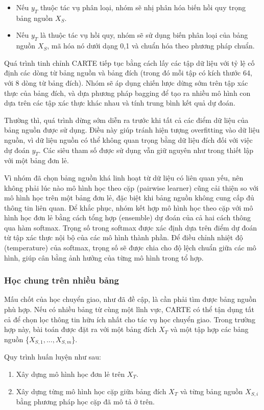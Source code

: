 \documentclass{article}
\begin{document}
\begin{itemize}
    \item Nếu $y_T$ thuộc tác vụ phân loại, nhóm sẽ nhị phân hóa biến hồi quy trọng bảng nguồn $X_S$.
    \item Nếu $y_T$ là thuộc tác vụ hồi quy, nhóm sẽ sử dụng biến phân loại của bảng nguồn $X_S$, mã hóa nó dưới dạng {0,1} và chuẩn hóa theo phương pháp chuẩn.
\end{itemize}

Quá trình tinh chỉnh CARTE tiếp tục bằng cách lấy các tập dữ liệu với tỷ lệ cố định các dòng từ bảng nguồn và bảng đích (trong đó mỗi tập có kích thước 64, với 8 dòng từ bảng đích). Nhóm sẽ áp dụng chiến lược dừng sớm trên tập xác thực của bảng đích, và dựa phương pháp bagging để tạo ra nhiều mô hình con dựa trên các tập xác thực khác nhau và tính trung bình kết quả dự đoán.

Thường thì, quá trình dừng sớm diễn ra trước khi tất cả các điểm dữ liệu của bảng nguồn được sử dụng. Điều này giúp tránh hiện tượng overfitting vào dữ liệu nguồn, vì dữ liệu nguồn có thể không quan trọng bằng dữ liệu đích đối với việc dự đoán $y_T$. Các siêu tham số được sử dụng vẫn giữ nguyên như trong thiết lập với một bảng đơn lẻ.

Vì nhóm đã chọn bảng nguồn khá linh hoạt từ dữ liệu có liên quan yếu, nên không phải lúc nào mô hình học theo cặp (pairwise learner) cũng cải thiện so với mô hình học trên một bảng đơn lẻ, đặc biệt khi bảng nguồn không cung cấp đủ thông tin liên quan. Để khắc phục, nhóm kết hợp mô hình học theo cặp với mô hình học đơn lẻ bằng cách tổng hợp (ensemble) dự đoán của cả hai cách thông qua hàm softmax. Trọng số trong softmax được xác định dựa trên điểm dự đoán từ tập xác thực nội bộ của các mô hình thành phần. Để điều chỉnh nhiệt độ (temperature) của softmax, trọng số sẽ được chia cho độ lệch chuẩn giữa các mô hình, giúp cân bằng ảnh hưởng của từng mô hình trong tổ hợp.

\subsubsection{Học chung trên nhiều bảng}
Mấu chốt của học chuyển giao, như đã đề cập, là cần phải tìm được bảng nguồn phù hợp. Nếu có nhiều bảng từ cùng một lĩnh vực, CARTE có thể tận dụng tất cả để chọn lọc thông tin hữu ích nhất cho tác vụ học chuyển giao. Trong trường hợp này, bài toán được đặt ra với một bảng đích $X_T$ và một tập hợp các bảng nguồn \{$X_{S,1}, ..., X_{S,m}$\}.

Quy trình huấn luyện như sau:
\begin{enumerate}
    \item Xây dựng mô hình học đơn lẻ trên $X_T$.
    \item Xây dựng từng mô hình học cặp giữa bảng đích $X_T$ và từng bảng nguồn $X_{S,i}$ bằng phương pháp học cặp đã mô tả ở trên.
\end{enumerate}
\end{document}
